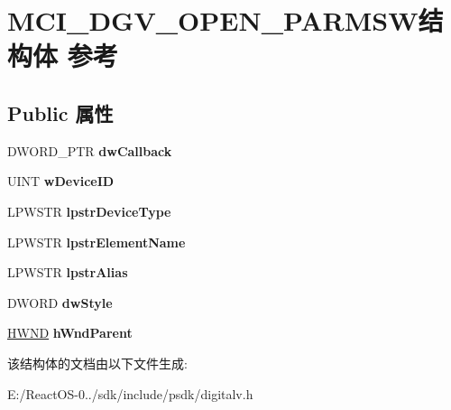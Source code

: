 \hypertarget{struct_m_c_i___d_g_v___o_p_e_n___p_a_r_m_s_w}{}\section{M\+C\+I\+\_\+\+D\+G\+V\+\_\+\+O\+P\+E\+N\+\_\+\+P\+A\+R\+M\+S\+W结构体 参考}
\label{struct_m_c_i___d_g_v___o_p_e_n___p_a_r_m_s_w}
\subsection*{Public 属性}
\begin{DoxyCompactItemize}
\item 
\mbox{\label{struct_m_c_i___d_g_v___o_p_e_n___p_a_r_m_s_w_a1ea787e7a1ec2826aa841e879b6f2beb}} 
D\+W\+O\+R\+D\+\_\+\+P\+TR {\bfseries dw\+Callback}
\item 
\mbox{\label{struct_m_c_i___d_g_v___o_p_e_n___p_a_r_m_s_w_a1a6ba9447c3fbe9c6b02a16c5ac26ae0}} 
U\+I\+NT {\bfseries w\+Device\+ID}
\item 
\mbox{\label{struct_m_c_i___d_g_v___o_p_e_n___p_a_r_m_s_w_ab8d0d2fbb706a93700f57f31d2089e21}} 
L\+P\+W\+S\+TR {\bfseries lpstr\+Device\+Type}
\item 
\mbox{\label{struct_m_c_i___d_g_v___o_p_e_n___p_a_r_m_s_w_ae919306888c39fe14a04201fec740d36}} 
L\+P\+W\+S\+TR {\bfseries lpstr\+Element\+Name}
\item 
\mbox{\label{struct_m_c_i___d_g_v___o_p_e_n___p_a_r_m_s_w_af46cab8ff5e6026302435aede824caed}} 
L\+P\+W\+S\+TR {\bfseries lpstr\+Alias}
\item 
\mbox{\label{struct_m_c_i___d_g_v___o_p_e_n___p_a_r_m_s_w_ab0ba41a65a1d003925fe621321795abc}} 
D\+W\+O\+RD {\bfseries dw\+Style}
\item 
\mbox{\label{struct_m_c_i___d_g_v___o_p_e_n___p_a_r_m_s_w_acc414beddefb0c37a2b3d1fbb6ebb097}} 
\hyperlink{interfacevoid}{H\+W\+ND} {\bfseries h\+Wnd\+Parent}
\end{DoxyCompactItemize}


该结构体的文档由以下文件生成\+:\begin{DoxyCompactItemize}
\item 
E\+:/\+React\+O\+S-\/0../sdk/include/psdk/digitalv.\+h\end{DoxyCompactItemize}
